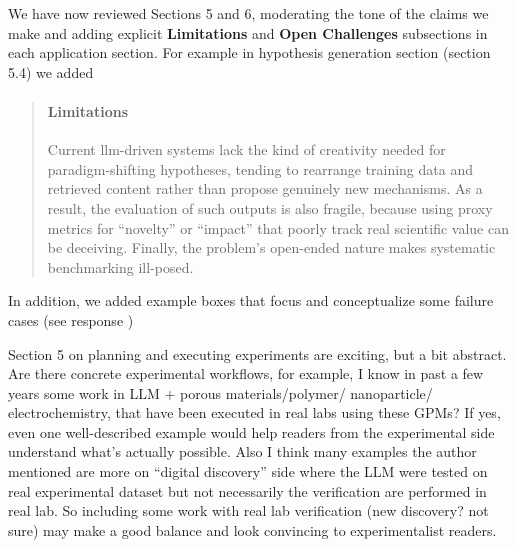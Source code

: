 \begin{reply}
 We have now reviewed Sections 5 and 6, moderating the tone of the claims we make and adding explicit \textbf{Limitations} and \textbf{Open Challenges} subsections in each application section. For example in hypothesis generation section (section 5.4) we added

\begin{quote}
    \paragraph{Limitations}

Current \gls{llm}-driven systems lack the kind of creativity needed for paradigm-shifting hypotheses, tending to rearrange training data and retrieved content rather than propose genuinely new mechanisms. As a result, the evaluation of such outputs is also fragile, because using proxy metrics for \enquote{novelty} or \enquote{impact} that poorly track real scientific value can be deceiving. Finally, the problem’s open-ended nature makes systematic benchmarking ill-posed.

\end{quote}

 
 In addition, we added example boxes that focus and conceptualize some failure cases (see response )
 
\end{reply}

\begin{point}
Section 5 on planning and executing experiments are exciting, but a bit abstract. Are there concrete experimental workflows, for example, I know in past a few years some work in LLM + porous materials/polymer/ nanoparticle/ electrochemistry, that have been executed in real labs using these GPMs? If yes, even one well-described example would help readers from the experimental side understand what's actually possible. Also I think many examples the author mentioned are more on ``digital discovery'' side where the LLM were tested on real experimental dataset but not necessarily the verification are performed in real lab. So including some work with real lab verification (new discovery? not sure) may make a good balance and look convincing to experimentalist readers.
\end{point}

